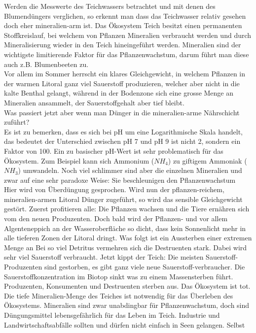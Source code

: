 \documentclass{article}
\begin{document}
        Werden die Messwerte des Teichwassers betrachtet und mit denen des Blumendüngers verglichen, so erkennt man dass das Teichwasser relativ gesehen doch eher mineralien-arm ist. Das Ökosystem Teich besitzt einen permanenten Stoffkreislauf, bei welchem von Pflanzen Mineralien verbraucht werden und durch Mineralisierung wieder in den Teich hineingeführt werden. Mineralien sind der wichtigste limitierende Faktor für das Pflanzenwachstum, darum führt man diese auch z.B. Blumenbeeten zu. \\
        Vor allem im Sommer herrscht ein klares Gleichgewicht, in welchem Pflanzen in der warmen Litoral ganz viel Sauerstoff produzieren, welcher aber nicht in die kalte Benthal gelangt, während in der Bodenzone sich eine grosse Menge an Mineralien ansammelt, der Sauerstoffgehalt aber tief bleibt. \\
        Was passiert jetzt aber wenn man Dünger in die mineralien-arme Nährschicht zuführt? \\
        Es ist zu bemerken, dass es sich bei pH um eine Logarithmische Skala handelt, das bedeutet der Unterschied zwischen pH 7 und pH 9 ist nicht 2, sondern ein Faktor von 100. Ein zu basischer pH-Wert ist sehr problematisch für das Ökosystem. Zum Beispiel kann sich Ammonium ($NH_4$) zu giftigem Ammoniak ($NH_3$) umwandeln.\cite{Teichpflege} Noch viel schlimmer sind aber die einzelnen Mineralien und zwar auf eine sehr paradoxe Weise: Sie beschleunigen den Pflanzenwachstum \\
        \vspace{5mm}
        Hier wird von Überdüngung gesprochen. Wird nun der pflanzen-reichem, mineralien-armen Litoral Dünger zugeführt, so wird das sensible Gleichgewicht gestört. Zuerst profitieren alle: Die Pflanzen wachsen und die Tiere ernähren sich vom den neuen Produzenten. Doch bald wird der Pflanzen- und vor allem Algenteneppich an der Wasseroberfläche so dicht, dass kein Sonnenlicht mehr in alle tieferen Zonen der Litoral dringt. Was folgt ist ein Aussterben einer extremen Menge an 
        \vspace{5mm}
        Bei so viel Detritus vermehren sich die Destruenten stark. Dabei wird sehr viel Sauerstoff verbraucht. Jetzt kippt der Teich: Die meisten Sauerstoff-Produzenten sind gestorben, es gibt ganz viele neue Sauerstoff-verbraucher. Die Sauerstoffkonzentration im Biotop sinkt was zu einem Massensterben führt. Produzenten, Konsumenten und Destruenten sterben aus. Das Ökosystem ist tot. \cite{Planet1} \cite{Planet2} \\
        \vspace{5mm}
        Die tiefe Mineralien-Menge des Teiches ist notwendig für das Überleben des Ökosystems. Mineralien sind zwar unabdingbar für Pflanzenwachstum, doch sind Düngungsmittel lebensgefährlich für das Leben im Teich. Industrie und Landwirtschaftsabfälle sollten und dürfen nicht einfach in Seen gelangen. \cite{Tagi} Selbst 
       
\end{document}
